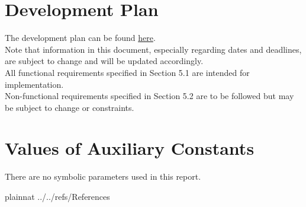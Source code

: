\documentclass[12pt]{article}
\begin{document}



\newpage

\section{Development Plan}

The development plan can be found \href{https://github.com/PlutosCapstone/Plutos/blob/main/docs/DevelopmentPlan/DevelopmentPlan.pdf}{here}. \\

\noindent Note that information in this document, especially regarding dates and deadlines, are subject to change and will be updated accordingly. \\

\noindent All functional requirements specified in Section 5.1 are intended for implementation. \\

\noindent Non-functional requirements specified in Section 5.2 are to be followed but may be subject to change or constraints. \\

\section{Values of Auxiliary Constants}

There are no symbolic parameters used in this report.

\newpage

 {plainnat}
 {../../refs/References}

\newpage

\noindent {}
\end{document}
